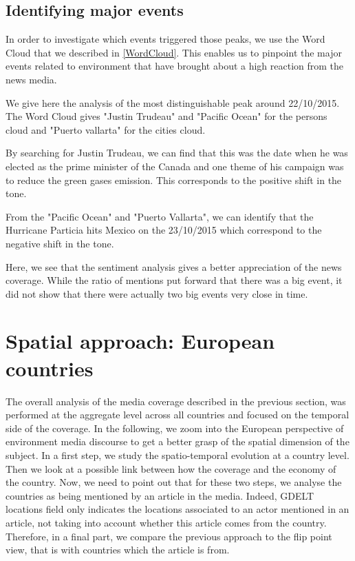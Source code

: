 \documentclass[11pt]{article}
\begin{document}
\subsection{Identifying major events}
\label{major_events}
In order to investigate which events triggered those peaks, we use the Word Cloud that we described in \ref{WordCloud}. This enables us to pinpoint the major events related to environment that have brought about a high reaction from the news media. 

We give here the analysis of the most distinguishable peak around 22/10/2015. 
The Word Cloud gives "Justin Trudeau" and "Pacific Ocean" for the persons cloud and "Puerto vallarta" for the cities cloud.

By searching for Justin Trudeau, we can find that this was the date when he was elected as the prime minister of the Canada and one theme of his campaign was to reduce the green gases emission. This corresponds to the positive shift in the tone.

From the "Pacific Ocean" and "Puerto Vallarta", we can identify that the Hurricane Particia hits Mexico on the 23/10/2015 which correspond to the negative shift in the tone.

Here, we see that the sentiment analysis gives a better appreciation of the news coverage. While the ratio of mentions put forward that there was a big event, it did not show that there were actually two big events very close in time.

\section{Spatial approach: European countries}
The overall analysis of the media coverage described in the previous section, was performed at the aggregate level across all countries and focused on the temporal side of the coverage. In the following, we zoom into the European perspective of environment media discourse to get a better grasp of the spatial dimension of the subject. 
In a first step, we study the spatio-temporal evolution at a country level. Then we look at a possible link between how the coverage and the economy of the country. 
Now, we need to point out that for these two steps, we analyse the countries as being mentioned by an article in the media. Indeed, GDELT locations field only indicates the locations associated to an actor mentioned in an article, not taking into account whether this article comes from the country. Therefore, in a final part, we compare the previous approach to the flip point view, that is with countries which the article is from.
\end{document}
